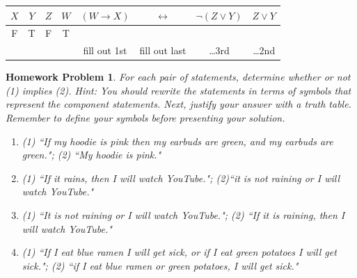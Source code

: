 \documentclass{article}
\newtheorem{hw}{Homework Problem}
\begin{document}
	\begin{center}
		\begin{tabular}{|c|c|c|c|ccc|c|}  %
			$X$ & $Y$ & $Z$ & $W$ & $(W \rightarrow X)$ & $\leftrightarrow$ & $\neg(Z \vee Y)$ & $Z\vee Y$ \\ \hline \hline
			F   & T   & F   & T   &                     &                   &                  &           \\
			&     &     &     & fill out 1st        & fill out last     & \dots 3rd        & \dots 2nd \\
		\end{tabular}
	\end{center}

	\underline{\hspace{5in}}

	\begin{hw}
		For each pair of statements, determine whether or not  (1) {\it implies}  (2). Hint: You should rewrite the statements in terms of symbols that represent the component statements. Next, justify your answer with a truth table. Remember to define your symbols before presenting your solution.
		\begin{enumerate}
			\item  (1) ``If my hoodie is pink then my earbuds are green, and my earbuds are green."; (2) ``My hoodie is pink."
			\item (1) ``If it rains, then I will watch YouTube."; (2)``it is not raining or I will watch YouTube."
			\item (1) ``It is not raining or I will watch YouTube."; (2) ``If it is raining, then I will watch YouTube."
			\item (1) ``If I eat blue ramen I will get sick, or if I eat green potatoes I will get sick."; (2) ``if I eat blue ramen or green potatoes, I will get sick."
		\end{enumerate}
	\end{hw}
\end{document}
